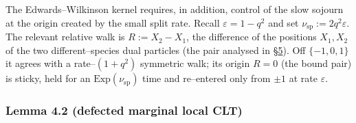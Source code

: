 \documentclass[11pt]{article}
\theoremstyle{plain}
\theoremstyle{definition}
\theoremstyle{remark}
\newcommand{\eps}{\varepsilon}\newcommand{\Exp}{\mathrm{Exp}}
\begin{document}
The Edwards--Wilkinson kernel requires, in addition, control of the slow sojourn at the
origin created by the small split rate. Recall $\eps=1-q^2$ and set
$\nu_{\mathrm{sp}}:=2q^2\eps$. The relevant relative walk is $R:=X_2-X_1$, the
difference of the positions $X_1,X_2$ of the two different--species dual particles (the
pair analysed in \S\hyperref[sec_kernel]{5}). Off $\{-1,0,1\}$ it agrees with a rate--$(1+q^2)$
symmetric walk; its origin $R=0$ (the bound pair) is sticky, held for an
$\Exp(\nu_{\mathrm{sp}})$ time and re--entered only from $\pm1$ at rate $\eps$.

\subsubsection{Lemma 4.2 (defected marginal local CLT)}\label{lem_Rlclt}
\end{document}
